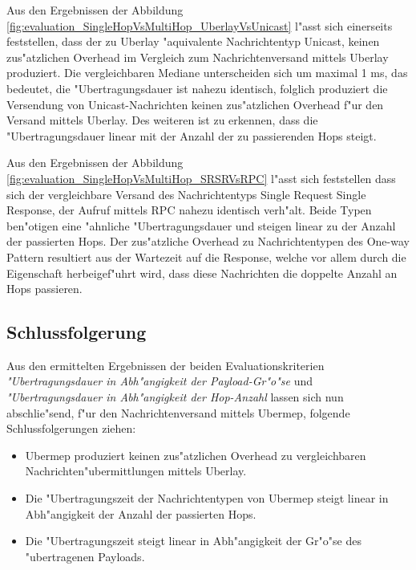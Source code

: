 Aus den Ergebnissen der Abbildung \ref{fig:evaluation_SingleHopVsMultiHop_UberlayVsUnicast} l"asst sich einerseits feststellen, dass der zu Uberlay "aquivalente Nachrichtentyp Unicast, keinen zus"atzlichen Overhead im Vergleich zum Nachrichtenversand mittels Uberlay produziert. Die vergleichbaren Mediane unterscheiden sich um maximal 1 ms, das bedeutet, die "Uber\-tra\-gungs\-dauer ist nahezu identisch, folglich produziert die Versendung von Unicast-Nachrichten keinen zus"atzlichen Overhead f"ur den Versand mittels Uberlay. Des weiteren ist zu erkennen, dass die "Uber\-tra\-gungs\-dauer linear mit der Anzahl der zu passierenden Hops steigt.

Aus den Ergebnissen der Abbildung \ref{fig:evaluation_SingleHopVsMultiHop_SRSRVsRPC} l"asst sich feststellen dass sich der vergleichbare Versand des Nachrichtentyps Single Request Single Response, der Aufruf mittels RPC nahezu identisch verh"alt. Beide Typen ben"otigen eine "ahnliche "Uber\-tra\-gungs\-dauer und steigen linear zu der Anzahl der passierten Hops. Der zus"atzliche Overhead zu Nachrichtentypen des One-way Pattern resultiert aus der Wartezeit auf die Response, welche vor allem durch die Eigenschaft herbeigef"uhrt wird, dass diese Nachrichten die doppelte Anzahl an Hops passieren.

\subsection{Schlussfolgerung}

Aus den ermittelten Ergebnissen der beiden Evaluationskriterien \emph{"Ubertragungsdauer in Abh"angigkeit der Payload-Gr"o"se} und \emph{"Ubertragungsdauer in Abh"angigkeit der Hop-Anzahl} lassen sich nun abschlie"send, f"ur den Nachrichtenversand mittels Ubermep, folgende Schlussfolgerungen ziehen:

\begin{itemize}
\item Ubermep produziert keinen zus"atzlichen Overhead zu vergleichbaren Nachrichten"ubermittlungen mittels Uberlay.
\item Die "Ubertragungszeit der Nachrichtentypen von Ubermep steigt linear in Abh"angigkeit der Anzahl der passierten Hops.
\item Die "Ubertragungszeit steigt linear in Abh"angigkeit der Gr"o"se des "uber\-tra\-genen Payloads.
\end{itemize}

